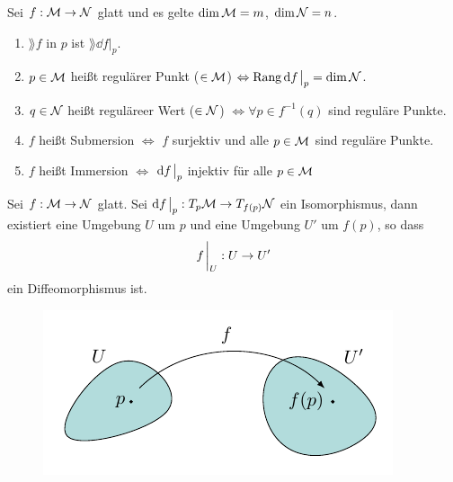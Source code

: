 \begin{defs} 
Sei $f: \mathcal{M} \to \mathcal{N}$ glatt und es gelte $\dim\mathcal{M}=m$, $\dim{\mathcal{N}} = n$.
\begin{enumerate}
\item $\rang f$ in $p$ ist $\rang \dd f \big \vert_p $.
\item $p\in\mathcal{M}$ heißt regulärer Punkt ($\in\mathcal{M}$)  $\Leftrightarrow \rang\dd f \eval_p=\dim\mfka$.
\item $q\in\mathcal{N}$ heißt reguläreer Wert ($\in\mathcal{N}$) $\Leftrightarrow \forall p \in f	^{-1}(q)$ sind reguläre Punkte.
\item $f$ heißt Submersion $\Leftrightarrow$ $f$ surjektiv und alle $p\in\mathcal{M}$ sind reguläre Punkte.
\item $f$ heißt Immersion $\Leftrightarrow$ $\dd f \eval_p$ injektiv für alle $p \in \mathcal{M}$
\end{enumerate}
\end{defs}

\begin{satz}[Umkehrsatz]
\label{satz:Umkehrsatz}
Sei $f: \mathcal{M} \to \mathcal{N}$ glatt. 
Sei $\dd f \eval_p : \tspace{p} \to T_{f(p)}\mfka$ ein Isomorphismus,
dann existiert eine Umgebung $U$ um $p$ und eine Umgebung $U'$ um $f(p)$, so dass
\begin{align}
f\eval_U : U \to U'
\end{align}
ein Diffeomorphismus ist.
\begin{figure}[H]
\centering
\includegraphics[width=0.5\linewidth]{figures/tikz/inverse_function_theorem.pdf}
\label{img:umkehrsatz}
\end{figure} 
\end{satz}

